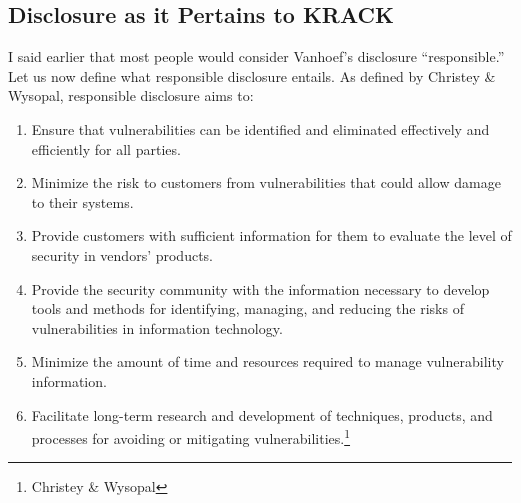 \documentclass[12pt]{article}
\begin{document}
\begin{doublespace}
\section*{Disclosure as it Pertains to KRACK}
I said earlier that most people would consider Vanhoef's disclosure
``responsible.'' Let us now define what responsible disclosure entails. As
defined by Christey \& Wysopal, responsible disclosure aims to:
\end{doublespace}
\begin{enumerate}
  \item Ensure that vulnerabilities can be identified and eliminated
    effectively and efficiently for all parties.
  \item Minimize the risk to customers from vulnerabilities that could
   allow damage to their systems.
  \item Provide customers with sufficient information for them to evaluate
   the level of security in vendors' products.
  \item Provide the security community with the information necessary to
   develop tools and methods for identifying, managing, and reducing the
   risks of vulnerabilities in information technology.
  \item Minimize the amount of time and resources required to manage
   vulnerability information.
  \item Facilitate long-term research and development of techniques,
   products, and processes for avoiding or mitigating vulnerabilities.\footnote{Christey \& Wysopal}
\end{enumerate}
\end{document}
